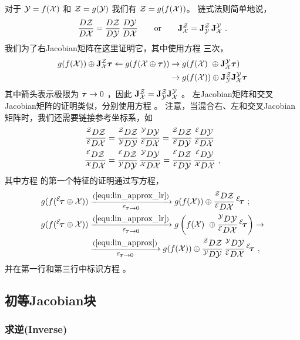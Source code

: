 对于 $\mathcal{Y}=f(\mathcal{X})$ 和 $\mathcal{Z}=g(\mathcal{Y})$ 我们有 $\mathcal{Z}=g(f(\mathcal{X}))$。
链式法则简单地说，
%
\begin{align}
\frac{D\mathcal{Z}}{D\mathcal{X}} = \frac{D\mathcal{Z}}{D\mathcal{Y}}\,\frac{D\mathcal{Y}}{D\mathcal{X}}
\qquad \textrm{or} \qquad
{{\bf J}^{\mathcal{Z}}_{\mathcal{X}}} = {{\bf J}^{\mathcal{Z}}_{\mathcal{Y}}}\,{{\bf J}^{\mathcal{Y}}_{\mathcal{X}}}
~.
\end{align}
%
我们为了右Jacobian矩阵在这里证明它，其中使用方程  三次，
%
\begin{align*}
g(f(\mathcal{X}))\oplus{{\bf J}^{\mathcal{Z}}_{\mathcal{X}}}{\bm \tau} \gets g(f(\mathcal{X}\oplus{\bm \tau})) &\to g(f(\mathcal{X})~\oplus{{\bf J}^{\mathcal{Y}}_{\mathcal{X}}}{\bm \tau}) 
 \\
 &\to g(f(\mathcal{X}))\oplus{{\bf J}^{\mathcal{Z}}_{\mathcal{Y}}}{{\bf J}^{\mathcal{Y}}_{\mathcal{X}}}{\bm \tau}
\end{align*}
%
其中箭头表示极限为 ${\bm \tau}\to0$ ，因此 ${{\bf J}^{\mathcal{Z}}_{\mathcal{X}}}={{\bf J}^{\mathcal{Z}}_{\mathcal{Y}}}{{\bf J}^{\mathcal{Y}}_{\mathcal{X}}}$ 。
左Jacobian矩阵和交叉Jacobian矩阵的证明类似，分别使用方程  。
%
注意，当混合右、左和交叉Jacobian矩阵时，我们还需要链接参考坐标系，如
%
\begin{align}
\rldpar{\cZ}{\cX}
 &= \rrdpar{\cZ}{\cY}\,\rldpar{\cY}{\cX}
 = \rldpar{\cZ}{\cY}\,\lldpar{\cY}{\cX} \label{equ:chain_rule_cross_1}
\\
\lrdpar{\cZ}{\cX}
 &= \lrdpar{\cZ}{\cY}\,\rrdpar{\cY}{\cX}
 = \lldpar{\cZ}{\cY}\,\lrdpar{\cY}{\cX}\label{equ:chain_rule_cross_2}
~,
\end{align}
%
其中方程  的第一个特征的证明通过写方程，
%
\begin{align*}
g(f({^\cE\!\bftau}\op\cX)) 
 &\xrightarrow[{^\cE\!\bftau}\to0]{\eqRef{equ:lin_approx_lr}} 
 g(f(\cX))\op\rldpar{\cZ}{\cX}\,{^\cE}\!\bftau
 ~; \\ 
g(f({^\cE\!\bftau}\op\cX)) 
 &\xrightarrow[{^\cE\!\bftau}\to0]{\eqRef{equ:lin_approx_lr}} 
 g\left(f(\cX)~\op\rldpar{\cY}{\cX}\,{^\cE}\!\bftau\right) \to
 \\
 &\xrightarrow[{^\cE\!\bftau}\to0]{\eqRef{equ:lin_approx}} 
 g(f(\cX))\op\rrdpar{\cZ}{\cY}\,\rldpar{\cY}{\cX}\,{^\cE}\!\bftau 
~,
\end{align*}
%
并在第一行和第三行中标识方程  。


\subsection{初等Jacobian块}
\label{sec:jacs_elementary}

\subsubsection{求逆(Inverse)}
\label{sec:Jac_inversion}

